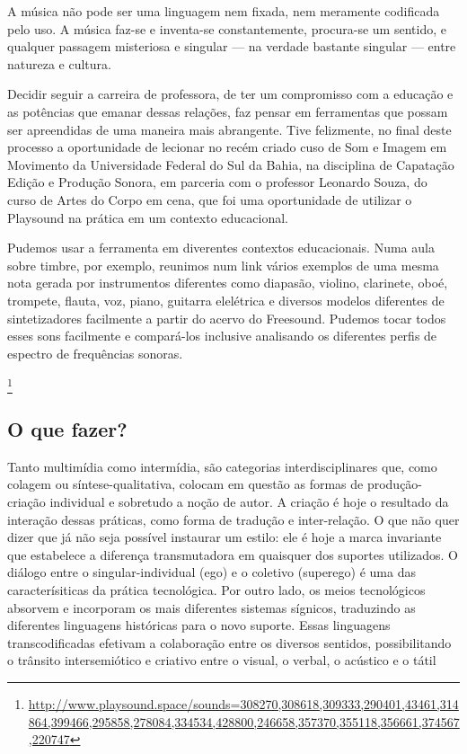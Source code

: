 \begin{citacao}
A música não pode ser uma linguagem nem fixada, nem meramente codificada pelo uso. A música faz-se e inventa-se constantemente, procura-se um sentido, e qualquer passagem misteriosa e singular — na verdade bastante singular — entre natureza e
cultura. \cite{Schaeffer2007}

Decidir seguir a carreira de professora, de ter um compromisso com a educação e as potências que emanar dessas relações, faz pensar em ferramentas que possam ser apreendidas de uma maneira mais abrangente. Tive felizmente, no final deste processo a oportunidade de lecionar no recém criado cuso de Som e Imagem em Movimento da Universidade Federal do Sul da Bahia, na disciplina de Capatação Edição e Produção Sonora, em parceria com o professor Leonardo Souza, do curso de Artes do Corpo em cena, que foi uma oportunidade de utilizar o Playsound na prática em um contexto educacional.

Pudemos usar a ferramenta em diverentes contextos educacionais. Numa aula sobre timbre, por exemplo, reunimos num link vários exemplos de uma mesma nota gerada por instrumentos diferentes como diapasão, violino, clarinete, oboé, trompete, flauta, voz, piano, guitarra elelétrica e diversos modelos diferentes de sintetizadores facilmente a partir do acervo do Freesound. Pudemos tocar todos esses sons facilmente e compará-los inclusive analisando os diferentes perfis de espectro de frequências sonoras.

\footnote{\url{http://www.playsound.space/sounds=308270,308618,309333,290401,43461,314864,399466,295858,278084,334534,428800,246658,357370,355118,356661,374567,220747}}









\subsection{O que fazer?} 

\begin{citacao}
Tanto multimídia como intermídia, são categorias interdisciplinares que, como colagem ou síntese-qualitativa, colocam em questão as formas de produção-criação individual e sobretudo a noção de autor. A criação é hoje o resultado da interação dessas práticas, como forma de tradução e inter-relação. O que não quer dizer que já não seja possível instaurar um estilo: ele é hoje a marca invariante que estabelece a diferença transmutadora em quaisquer dos suportes utilizados. O diálogo entre o singular-individual (ego) e o coletivo (superego) é uma das caracterísiticas da prática tecnológica. Por outro lado, os meios tecnológicos absorvem e incorporam os mais diferentes sistemas sígnicos, traduzindo as diferentes linguagens históricas para o novo suporte. Essas linguagens transcodificadas efetivam a colaboração entre os diversos sentidos, possibilitando o trânsito intersemiótico e criativo entre o visual, o verbal, o acústico e o tátil \cite[66]{JulioPlaza1969}
\end{citacao}


\end{citacao}
